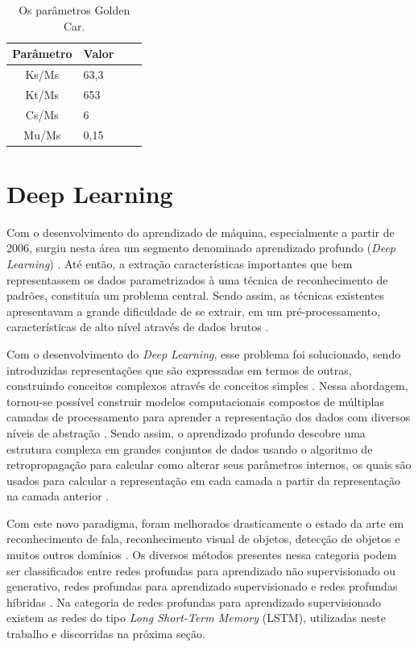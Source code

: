 \begin{table}[h!]
    \caption{Os parâmetros Golden Car.}
    \label{table:golden_car_parameters}
    \centering
    \begin{tabular}{clll}
        \toprule
        \textbf{Parâmetro} & \textbf{Valor} \\
        \toprule
        Ks/Ms & 63,3 \\
        \midrule
        Kt/Ms & 653 \\
        \midrule
        Cs/Ms & 6 \\
        \midrule
        Mu/Ms & 0,15 \\
        \bottomrule
    \end{tabular}
\end{table}

\section{Deep Learning}

Com o desenvolvimento do aprendizado de máquina, especialmente a partir de 2006, surgiu nesta área um segmento denominado aprendizado profundo (\textit{Deep Learning}) \cite{Deng2014}. Até então, a extração características importantes que bem representassem os dados parametrizados à uma técnica de reconhecimento de padrões, constituía um problema central. Sendo assim, as técnicas existentes apresentavam a grande dificuldade de se extrair, em um pré-processamento, características de alto nível através de dados brutos \cite{Goodfellow2016}. 

Com o desenvolvimento do \textit{Deep Learning}, esse problema foi solucionado, sendo introduzidas representações que são expressadas em termos de outras, construindo conceitos complexos através de conceitos simples \cite{Goodfellow2016}. Nessa abordagem, tornou-se possível construir modelos computacionais compostos de múltiplas camadas de processamento para aprender a representação dos dados com diversos níveis de abstração \cite{LeCun2015}. Sendo assim, o aprendizado profundo descobre uma estrutura complexa em grandes conjuntos de dados usando o algoritmo de retropropagação para calcular como alterar seus parâmetros internos, os quais são usados para calcular a representação em cada camada a partir da representação na camada anterior \cite{LeCun2015}.

Com este novo paradigma, foram melhorados drasticamente o estado da arte em reconhecimento de fala, reconhecimento visual de objetos, detecção de objetos e muitos outros domínios \cite{LeCun2015}. Os diversos métodos presentes nessa categoria podem ser classificados entre redes profundas para aprendizado não supervisionado ou generativo, redes profundas para aprendizado supervisionado e redes profundas híbridas \cite{Deng2014}. Na categoria de redes profundas para aprendizado supervisionado existem as redes do tipo \textit{Long Short-Term Memory} (LSTM), utilizadas neste trabalho e discorridas na próxima seção.

